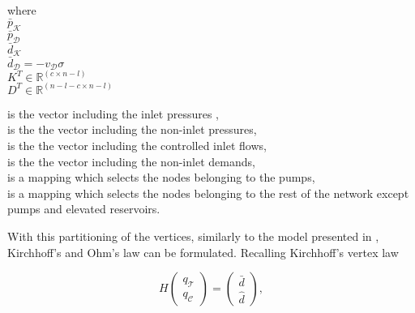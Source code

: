  \begin{minipage}[t]{0.3\textwidth}
where\\
\hspace*{8mm} $\bar{p}_{\mathcal{K}}$ \\
\hspace*{8mm} $\bar{p}_{\mathcal{D}}$  \\
\hspace*{8mm} $\bar{d}_{\mathcal{K}}$ \\
\hspace*{8mm} $\bar{d}_{\mathcal{D}} = -v_{\mathcal{D}} \sigma$  \\
\hspace*{8mm} $K^T \in  \mathbb{R}^{(c  \times n-l)}$ \\
\newline
\hspace*{8mm} $D^T \in  \mathbb{R}^{(n-l-c  \times n-l)}$
\end{minipage}
\begin{minipage}[t]{0.68\textwidth}
\vspace*{2mm}
is the vector including the inlet pressures ,\\
is the the vector including the non-inlet pressures, \\
is the the vector including the controlled inlet flows, \\
is the the vector including the non-inlet demands, \\
is a mapping which selects the nodes belonging to the pumps, \\
is a mapping which selects the nodes belonging to the rest of the network except pumps and elevated reservoirs.
\end{minipage}

With this partitioning of the vertices, similarly to the model presented in , Kirchhoff's and Ohm's law can be formulated. Recalling Kirchhoff's vertex law

\begin{equation}
\label{kirchhoffslaw_matrix}
H
 \begin{pmatrix} 
 q_\mathcal{T} \\[3pt]
 q_\mathcal{C} 
 \end{pmatrix}
 =
\begin{pmatrix} 
 \bar{d}  \\[3pt] 
 \hat{d}  
 \end{pmatrix},
\end{equation}

